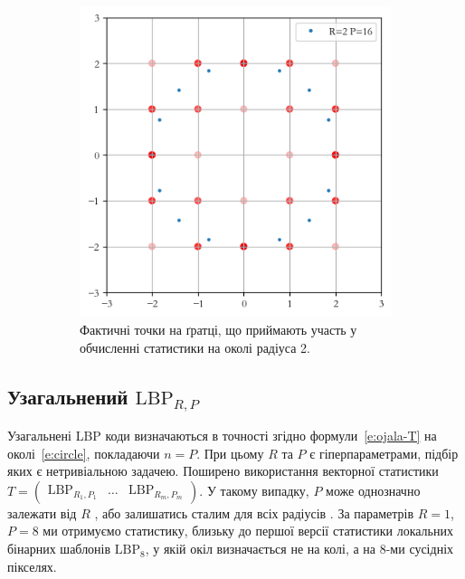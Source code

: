 \begin{figure}[h]
\begin{subfigure}{0.48\textwidth}
    \includegraphics[width=0.9\linewidth]{img/clique-2-interp.png}
    \caption{
        Фактичні точки на ґратці, що приймають участь у обчисленні статистики на околі радіуса 2.
    }
    \label{subfig:clique-2b}
    \end{subfigure}
    
    \caption{}
    \label{fig:clique-2}
\end{figure}

\subsection{Узагальнений \(\mathrm{LBP}_{R,P}\)}\label{section1.1a}\hfill

Узагальнені LBP коди \cite{ojala2002} визначаються в точності згідно формули~\eqref{e:ojala-T} на околі~\eqref{e:circle}, покладаючи $n=P$.
При цьому $R$ та $P$ є гіперпараметрами, підбір яких є нетривіальною задачею.
Поширено використання векторної статистики $T = \begin{pmatrix}
    \mathrm{LBP}_{R_1,P_1} & \dots  & \mathrm{LBP}_{R_m,P_m}
\end{pmatrix}$. У такому випадку, $P$ може однозначно залежати від $R$ \cite{fastlbp2024}, або залишатись сталим для всіх радіусів \cite{huawudeng2004}.
За параметрів $R=1$, $P=8$ ми отримуємо статистику, близьку до першої версії статистики локальних бінарних шаблонів $\mathrm{LBP}_8$, у якій окіл визначається не на колі, а на 8-ми сусідніх пікселях.

